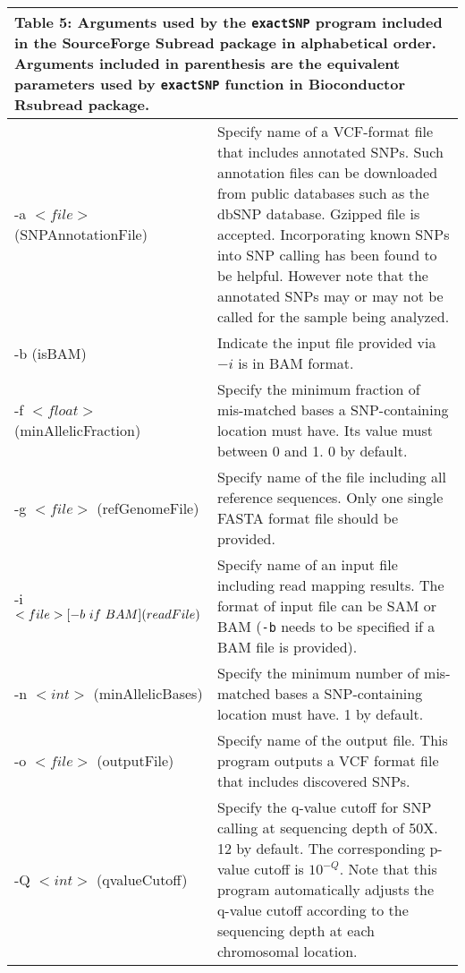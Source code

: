 \documentclass[12pt]{report}
\newcommand{\code}[1]{{\small\texttt{#1}}}
\newcommand{\Subread}{\textsf{Subread}}
\newcommand{\Rsubread}{\textsf{Rsubread}}
\begin{document}
\begin{longtable}{|p{4.5cm}|p{11cm}|}
\multicolumn{2}{p{16cm}}{Table 5: Arguments used by the \code{exactSNP} program included in the SourceForge {\Subread} package in alphabetical order.
Arguments included in parenthesis are the equivalent parameters used by \code{exactSNP} function in Bioconductor {\Rsubread} package.}
\endfirsthead
\hline
Arguments & Description \\
\hline
-a $<file>$ \newline (SNPAnnotationFile) & Specify name of a VCF-format file that includes annotated SNPs. Such annotation files can be downloaded from public databases such as the dbSNP database. Gzipped file is accepted. Incorporating known SNPs into SNP calling has been found to be helpful. However note that the annotated SNPs may or may not be called for the sample being analyzed. \\
\hline
-b \newline (isBAM) & Indicate the input file provided via $-i$ is in BAM format. \\
\hline
-f $<float>$ \newline (minAllelicFraction) & Specify the minimum fraction of mis-matched bases a SNP-containing location must have. Its value must between 0 and 1. 0 by default. \\
\hline
-g $<file>$ \newline (refGenomeFile) & Specify name of the file including all reference sequences. Only one single FASTA format file should be provided. \\
\hline
-i $<file> [-b\ if\ BAM] \newline (readFile)$ & Specify name of an input file including read mapping results. The format of input file can be SAM or BAM  (\code{-b} needs to be specified if a BAM file is provided).\\
\hline
-n $<int>$ \newline (minAllelicBases) & Specify the minimum number of mis-matched bases a SNP-containing location must have. 1 by default.\\
\hline
-o $<file>$ \newline (outputFile) & Specify name of the output file. This program outputs a VCF format file that includes discovered SNPs. \\
\hline
-Q $<int>$  \newline (qvalueCutoff) &  Specify the q-value cutoff for SNP calling at sequencing depth of 50X. 12 by default. The corresponding p-value cutoff is $10^{-Q}$. Note that this program automatically adjusts the q-value cutoff according to the sequencing depth at each chromosomal location.\\

\end{longtable}
\end{document}
